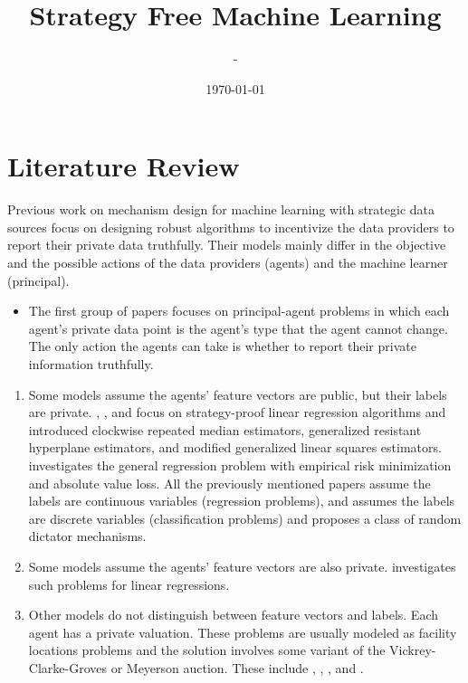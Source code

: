 \documentclass{article}
\title{Strategy Free Machine Learning}
\author{-}
\date{\today}
\begin{document}
\newtheorem{thm}{Theorem}
\newtheorem{cor}{Corollary}
\newtheorem{lem}{Lemma}
\newtheorem{prop}{Proposition}
\newtheorem{conj}{Conjecture}
\newtheorem{algo}{Algorithm}
\newtheorem{obs}{Observation}
\newtheorem{clm}{Claim}
\theoremstyle{definition}
\newtheorem{df}{Definition}
\newtheorem{eg}{Example}
\newtheorem{asm}{Assumption}
\newtheorem{cond}{Condition}
\theoremstyle{remark}
\newtheorem{rmk}{Remark}
\maketitle \onehalfspacing \allowdisplaybreaks \raggedbottom


\section{Literature Review} 
Previous work on mechanism design for machine learning with strategic data sources focus on designing robust algorithms to incentivize the data providers to report their private data truthfully. Their models mainly differ in the objective and the possible actions of the data providers (agents) and the machine learner (principal).
\begin{itemize}
\item The first group of papers focuses on principal-agent problems in which each agent's private data point is the agent's type that the agent cannot change. The only action the agents can take is whether to report their private information truthfully.
\end{itemize}
\begin{enumerate}
\item Some models assume the agents' feature vectors are public, but their labels are private. \citet*{perote2004strategy}, \citet*{chen2018strategyproof}, and \citet*{gast2013linear} focus on strategy-proof linear regression algorithms and introduced clockwise repeated median estimators, generalized resistant hyperplane estimators, and modified generalized linear squares estimators. \citet*{dekel2010incentive} investigates the general regression problem with empirical risk minimization and absolute value loss. All the previously mentioned papers assume the labels are continuous variables (regression problems), and \citet*{meir2012algorithms} assumes the labels are discrete variables (classification problems) and proposes a class of random dictator mechanisms.
\item Some models assume the agents' feature vectors are also private. \citet*{chen2019grinding} investigates such problems for linear regressions.
\item Other models do not distinguish between feature vectors and labels. Each agent has a private valuation. These problems are usually modeled as facility locations problems and the solution involves some variant of the Vickrey-Clarke-Groves or Meyerson auction. These include \citet*{dutting2017optimal}, \citet*{golowich2018deep}, \citet*{epasto2018incentive}, and \citet*{procaccia2009approximate}.
\end{enumerate}
\end{document}
